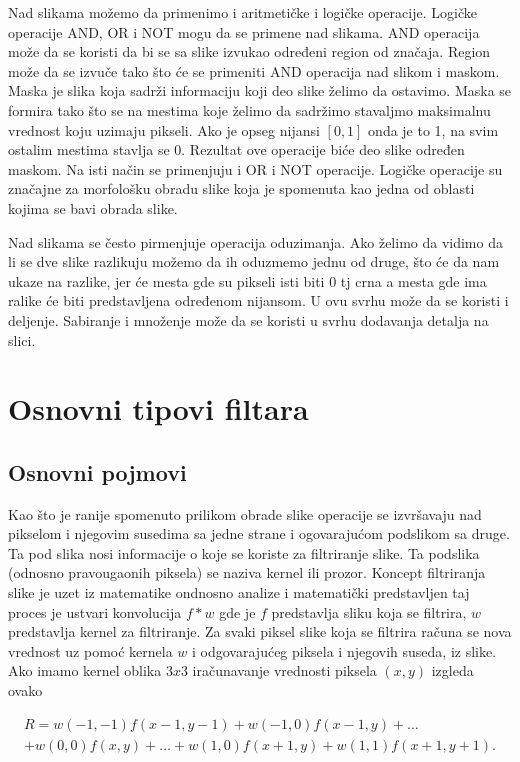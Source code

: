 \documentclass[a4paper,12pt,titlepage]{article}
\begin{document}
Nad slikama možemo da primenimo i aritmetičke i logičke operacije. Logičke operacije AND, OR i NOT mogu da se primene nad slikama. AND operacija može da se koristi da bi se sa slike izvukao određeni region od značaja. Region može da se izvuče tako što će se primeniti AND operacija nad slikom i maskom. Maska je slika koja sadrži informaciju koji deo slike želimo da ostavimo. Maska se formira tako što se na mestima koje želimo da sadržimo stavaljmo maksimalnu vrednost koju uzimaju pikseli. Ako je opseg nijansi $[0, 1]$ onda je to 1, na svim ostalim mestima stavlja se 0. Rezultat ove operacije biće deo slike određen maskom. Na isti način se primenjuju i OR i NOT operacije. Logičke operacije su značajne za morfološku obradu slike koja je spomenuta kao jedna od oblasti kojima se bavi obrada slike. 

Nad slikama se često pirmenjuje operacija oduzimanja. Ako želimo da vidimo da li se dve slike razlikuju možemo da ih oduzmemo jednu od druge, što će da nam ukaze na razlike, jer će mesta gde su pikseli isti biti 0 tj crna a mesta gde ima ralike će biti predstavljena određenom nijansom. U ovu svrhu može da se koristi i deljenje. Sabiranje i množenje može da se koristi u svrhu dodavanja detalja na slici. 

\section{Osnovni tipovi filtara}%

\subsection{Osnovni pojmovi}%

Kao što je ranije spomenuto prilikom obrade slike operacije se izvršavaju nad pikselom i njegovim susedima sa jedne strane i ogovarajućom podslikom sa druge. Ta pod slika nosi informacije o koje se koriste za filtriranje slike. Ta podslika (odnosno pravougaonih piksela) se naziva kernel ili prozor. Koncept filtriranja slike je uzet iz matematike ondnosno analize i matematički predstavljen taj proces je ustvari konvolucija $f * w$ gde je $f$ predstavlja sliku koja se filtrira, $w$ predstavlja kernel za filtriranje. Za svaki piksel slike koja se filtrira računa se nova vrednost uz pomoć kernela $w$ i odgovarajućeg piksela i njegovih suseda, iz slike. Ako imamo kernel oblika $3 x 3$ iračunavanje vrednosti piksela $(x, y)$ izgleda ovako

\begin{equation}\label{eq:conv1}
\begin{split}
R = w(-1, -1)f(x - 1, y - 1) + w(-1, 0)f(x - 1, y) + \dots \\
+ w(0, 0)f(x, y) + \dots + w(1, 0)f(x + 1, y) + w(1, 1)f(x + 1, y + 1).
\end{split}
\end{equation}
\end{document}
